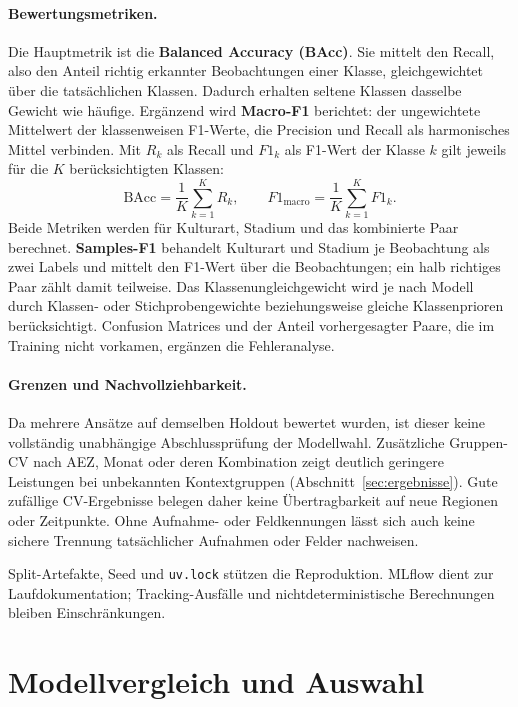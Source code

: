 \documentclass[11pt,a4paper,titlepage]{article}
\begin{document}
\paragraph{Bewertungsmetriken.}
Die Hauptmetrik ist die \textbf{Balanced Accuracy (BAcc)}. Sie mittelt den
Recall, also den Anteil richtig erkannter Beobachtungen einer Klasse,
gleichgewichtet \"uber die tats\"achlichen Klassen. Dadurch erhalten seltene
Klassen dasselbe Gewicht wie h\"aufige. Erg\"anzend wird \textbf{Macro-F1}
berichtet: der ungewichtete Mittelwert der klassenweisen F1-Werte, die
Precision und Recall als harmonisches Mittel verbinden.
Mit $R_k$ als Recall und $F1_k$ als F1-Wert der Klasse $k$ gilt jeweils
f\"ur die $K$ ber\"ucksichtigten Klassen:
\[
	\mathrm{BAcc} = \frac{1}{K}\sum_{k=1}^{K} R_k,
	\qquad
	F1_{\mathrm{macro}} = \frac{1}{K}\sum_{k=1}^{K} F1_k.
\]
Beide Metriken werden f\"ur Kulturart, Stadium und das kombinierte Paar
berechnet. \textbf{Samples-F1} behandelt Kulturart und Stadium je Beobachtung
als zwei Labels und mittelt den F1-Wert \"uber die Beobachtungen; ein halb
richtiges Paar z\"ahlt damit teilweise. Das Klassenungleichgewicht wird je nach Modell durch
Klassen- oder Stichprobengewichte beziehungsweise gleiche Klassenprioren
ber\"ucksichtigt. Confusion Matrices und der Anteil vorhergesagter Paare,
die im Training nicht vorkamen, erg\"anzen die Fehleranalyse.

\paragraph{Grenzen und Nachvollziehbarkeit.}
Da mehrere Ans\"atze auf demselben Holdout bewertet wurden, ist dieser keine
vollst\"andig unabh\"angige Abschlusspr\"ufung der Modellwahl. Zus\"atzliche
Gruppen-CV nach AEZ, Monat oder deren Kombination zeigt deutlich geringere
Leistungen bei unbekannten Kontextgruppen (Abschnitt~\ref{sec:ergebnisse}). Gute zuf\"allige CV-Ergebnisse
belegen daher keine \"Ubertragbarkeit auf neue Regionen oder Zeitpunkte.
Ohne Aufnahme- oder Feldkennungen l\"asst sich auch keine sichere Trennung
tats\"achlicher Aufnahmen oder Felder nachweisen.

Split-Artefakte, Seed und \texttt{uv.lock} st\"utzen die Reproduktion.
MLflow dient zur Laufdokumentation; Tracking-Ausf\"alle und
nichtdeterministische Berechnungen bleiben Einschr\"ankungen.

\section{Modellvergleich und Auswahl}
\label{sec:modellvergleich}
\end{document}
